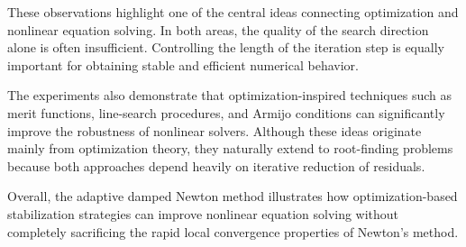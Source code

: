 These observations highlight one of the central ideas connecting optimization and nonlinear equation solving. In both areas, the quality of the search direction alone is often insufficient. Controlling the length of the iteration step is equally important for obtaining stable and efficient numerical behavior.

The experiments also demonstrate that optimization-inspired techniques such as merit functions, line-search procedures, and Armijo conditions can significantly improve the robustness of nonlinear solvers. Although these ideas originate mainly from optimization theory, they naturally extend to root-finding problems because both approaches depend heavily on iterative reduction of residuals.

Overall, the adaptive damped Newton method illustrates how optimization-based stabilization strategies can improve nonlinear equation solving without completely sacrificing the rapid local convergence properties of Newton's method.